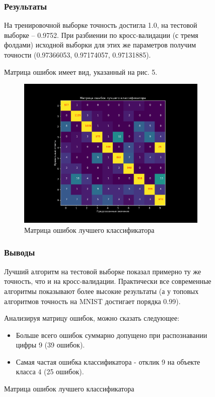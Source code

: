 \documentclass{article}
\begin{document}
\begin{figure}[H]
            \subsubsection{Результаты}
                На тренировочной выборке точность достигла 1.0, на тестовой выборке -- 0.9752.
                При разбиении по кросс-валидации (с тремя фолдами) исходной выборки для этих же параметров получим точности (0.97366053, 0.97174057, 0.97131885).


                Матрица ошибок имеет вид, указанный на рис. 5.
                \begin{figure}[h]
                    \centering
                    \includegraphics[width=0.8\linewidth]{./pictures/Confusion.pdf}
                    \caption{Матрица ошибок лучшего классификатора}
                    \label{fig:mpr}
                \end{figure}
            \subsubsection{Выводы}
                Лучший алгоритм на тестовой выборке показал примерно ту же точность, что и на кросс-валидации.
                Практически все современные алгоритмы показывают более высокие результаты (а у топовых алгоритмов точность на MNIST достигает порядка 0.99).

                Анализируя матрицу ошибок, можно сказать следующее:
                \begin{itemize}
                    \item Больше всего ошибок суммарно допущено при распознавании цифры 9 (39 ошибок).
                    \item Самая частая ошибка классификатора - отклик 9 на объекте класса 4 (25 ошибок).
                \end{itemize}


\end{figure}
\end{document}
